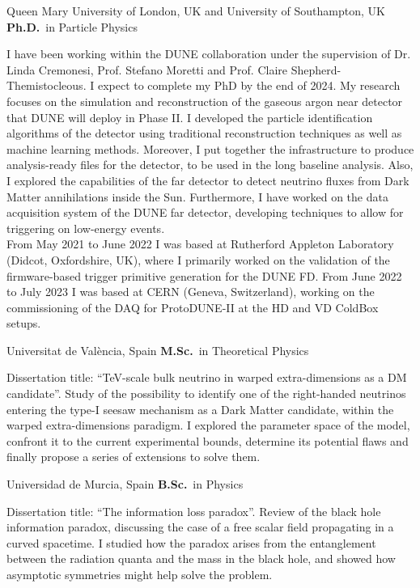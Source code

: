 	{%
		Queen Mary University of London, UK \newline \hfill and
		University of Southampton, UK}
	{%
		\textbf{Ph.D.}~in Particle Physics}
	{%
		\begin{justify}\noindent
			I have been working within the DUNE collaboration under the supervision of Dr. Linda Cremonesi, Prof. Stefano Moretti and Prof. Claire Shepherd-Themistocleous. I expect to complete my PhD by the end of 2024. \newline
			My research focuses on the simulation and reconstruction of the gaseous argon near detector that DUNE will deploy in Phase II. I developed the particle identification algorithms of the detector using traditional reconstruction techniques as well as machine learning methods. Moreover, I put together the infrastructure to produce analysis-ready files for the detector, to be used in the long baseline analysis. Also, I explored the capabilities of the far detector to detect neutrino fluxes from Dark Matter annihilations inside the Sun. \newline
			Furthermore, I have worked on the data acquisition system of the DUNE far detector, developing techniques to allow for triggering on low-energy events.
			\newline \\
			From May 2021 to June 2022 I was based at Rutherford Appleton Laboratory (Didcot, Oxfordshire, UK), where I primarily worked on the validation of the firmware-based trigger primitive generation for the DUNE FD. \newline
			From June 2022 to July 2023 I was based at CERN (Geneva, Switzerland), working on the commissioning of the DAQ for ProtoDUNE-II at the HD and VD ColdBox setups.
		\end{justify}
	}

		{%
			Universitat de València, Spain}
		{%
			\textbf{M.Sc.}~in Theoretical Physics}
		{%
			\begin{justify}\noindent
				Dissertation title: ``TeV-scale bulk neutrino in warped extra-dimensions as a DM candidate''. \newline
				Study of the possibility to identify one of the right-handed neutrinos entering the type-I seesaw mechanism as a Dark Matter candidate, within the warped extra-dimensions paradigm. I explored the parameter space of the model, confront it to the current experimental bounds, determine its potential flaws and finally propose a series of extensions to solve them.
			\end{justify}
		}

			{%
				Universidad de Murcia, Spain}
			{%
				\textbf{B.Sc.}~in Physics}
			{%
				\begin{justify}\noindent
					Dissertation title: ``The information loss paradox''. \newline
					Review of the black hole information paradox, discussing the case of a free scalar field propagating in a curved spacetime. I studied how the paradox arises from the entanglement between the radiation quanta and the mass in the black hole, and showed how asymptotic symmetries might help solve the problem.
				\end{justify}
			}